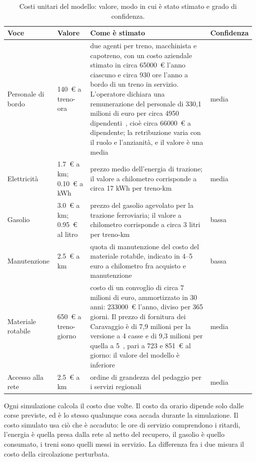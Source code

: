 \begin{table}[H]
	\centering
	\caption{Costi unitari del modello: valore, modo in cui è stato stimato e grado di confidenza.}
	\label{tab:costi-stime}
	\small
	\begin{tabularx}{\textwidth}{>{\raggedright\arraybackslash}p{}>{\raggedright\arraybackslash}p{}>{\raggedright\arraybackslash}Xl}
		\toprule
		Voce & Valore & Come è stimato & Confidenza \\
		\midrule
		Personale di bordo & \SI{140}{\euro} a treno-ora & due agenti per treno, macchinista e capotreno, con un costo aziendale stimato in circa \SI{65000}{\euro} l'anno ciascuno e circa 930 ore l'anno a bordo di un treno in servizio. L'operatore dichiara una remunerazione del personale di 330,1 milioni di euro per circa 4950 dipendenti~\cite{trenord2026bilancio}, cioè circa \SI{66000}{\euro} a dipendente; la retribuzione varia con il ruolo e l'anzianità, e il valore è una media & media \\
		Elettricità & \SI{1,7}{\euro} a km; \SI{0,10}{\euro} a kWh & prezzo medio dell'energia di trazione; il valore a chilometro corrisponde a circa 17 kWh per treno-km & media \\
		Gasolio & \SI{3,0}{\euro} a km; \SI{0,95}{\euro} al litro & prezzo del gasolio agevolato per la trazione ferroviaria; il valore a chilometro corrisponde a circa 3 litri per treno-km & bassa \\
		Manutenzione & \SI{2,5}{\euro} a km & quota di manutenzione del costo del materiale rotabile, indicato in 4--5 euro a chilometro fra acquisto e manutenzione & bassa \\
		Materiale rotabile & \SI{650}{\euro} a treno-giorno & costo di un convoglio di circa 7 milioni di euro, ammortizzato in 30 anni: \SI{233000}{\euro} l'anno, diviso per 365 giorni. Il prezzo di fornitura dei Caravaggio è di 7,9 milioni per la versione a 4 casse e di 9,3 milioni per quella a 5~\cite{fnm2018accordo}, pari a 723 e \SI{851}{\euro} al giorno: il valore del modello è inferiore & media \\
		Accesso alla rete & \SI{2,5}{\euro} a km & ordine di grandezza del pedaggio per i servizi regionali & media \\
		\bottomrule
	\end{tabularx}
\end{table}

Ogni simulazione calcola il costo due volte. Il costo da orario dipende solo dalle corse previste, ed è lo stesso qualunque cosa accada durante la simulazione. Il costo simulato usa ciò che è accaduto: le ore di servizio comprendono i ritardi, l'energia è quella presa dalla rete al netto del recupero, il gasolio è quello consumato, i treni sono quelli messi in servizio. La differenza fra i due misura il costo della circolazione perturbata.

